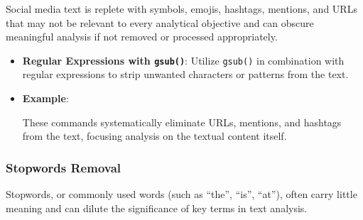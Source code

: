 \documentclass[
]{book}
\newenvironment{Shaded}{\begin{snugshade}}{\end{snugshade}}
\newcommand{\CommentTok}[1]{\textcolor[rgb]{0.56,0.35,0.01}{\textit{#1}}}
\newcommand{\FunctionTok}[1]{\textcolor[rgb]{0.13,0.29,0.53}{\textbf{#1}}}
\newcommand{\NormalTok}[1]{#1}
\newcommand{\OtherTok}[1]{\textcolor[rgb]{0.56,0.35,0.01}{#1}}
\newcommand{\SpecialCharTok}[1]{\textcolor[rgb]{0.81,0.36,0.00}{\textbf{#1}}}
\newcommand{\StringTok}[1]{\textcolor[rgb]{0.31,0.60,0.02}{#1}}
\begin{document}
Social media text is replete with symbols, emojis, hashtags, mentions, and URLs that may not be relevant to every analytical objective and can obscure meaningful analysis if not removed or processed appropriately.

\begin{itemize}
\item
  \textbf{Regular Expressions with \texttt{gsub()}}: Utilize \texttt{gsub()} in combination with regular expressions to strip unwanted characters or patterns from the text.
\item
  \textbf{Example}:

\begin{Shaded}
\end{Shaded}

  These commands systematically eliminate URLs, mentions, and hashtags from the text, focusing analysis on the textual content itself.
\end{itemize}

\hypertarget{stopwords-removal}{%
\subsubsection{Stopwords Removal}\label{stopwords-removal}}

Stopwords, or commonly used words (such as ``the'', ``is'', ``at''), often carry little meaning and can dilute the significance of key terms in text analysis.
\end{document}
